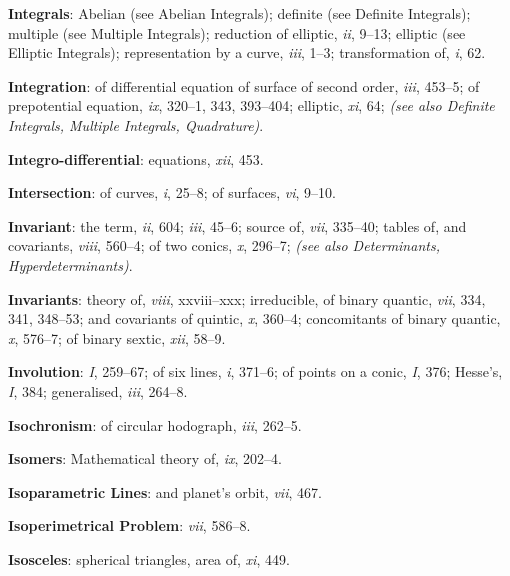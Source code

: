 \documentclass[11pt,a4paper]{article}
\newcommand{\IndexEntry}[1]{\textbf{#1}}
\newcommand{\SeeAlso}[1]{\textit{(see also #1)}}
\newcommand{\V}[1]{\textit{#1}} %
\begin{document}
\newpage

\setcounter{page}{105}

\IndexEntry{Integrals}: Abelian (see Abelian Integrals); definite (see Definite Integrals); multiple (see Multiple Integrals); reduction of elliptic, \V{ii}, 9--13; elliptic (see Elliptic Integrals); representation by a curve, \V{iii}, 1--3; transformation of, \V{i}, 62.

\IndexEntry{Integration}: of differential equation of surface of second order, \V{iii}, 453--5; of prepotential equation, \V{ix}, 320--1, 343, 393--404; elliptic, \V{xi}, 64; \SeeAlso{Definite Integrals, Multiple Integrals, Quadrature}.

\IndexEntry{Integro-differential}: equations, \V{xii}, 453.

\IndexEntry{Intersection}: of curves, \V{i}, 25--8; of surfaces, \V{vi}, 9--10.

\IndexEntry{Invariant}: the term, \V{ii}, 604; \V{iii}, 45--6; source of, \V{vii}, 335--40; tables of, and covariants, \V{viii}, 560--4; of two conics, \V{x}, 296--7; \SeeAlso{Determinants, Hyperdeterminants}.

\IndexEntry{Invariants}: theory of, \V{viii}, xxviii--xxx; irreducible, of binary quantic, \V{vii}, 334, 341, 348--53; and covariants of quintic, \V{x}, 360--4; concomitants of binary quantic, \V{x}, 576--7; of binary sextic, \V{xii}, 58--9.

\IndexEntry{Involution}: \V{I}, 259--67; of six lines, \V{i}, 371--6; of points on a conic, \V{I}, 376; Hesse's, \V{I}, 384; generalised, \V{iii}, 264--8.

\IndexEntry{Isochronism}: of circular hodograph, \V{iii}, 262--5.

\IndexEntry{Isomers}: Mathematical theory of, \V{ix}, 202--4.

\IndexEntry{Isoparametric Lines}: and planet's orbit, \V{vii}, 467.

\IndexEntry{Isoperimetrical Problem}: \V{vii}, 586--8.

\newpage

\setcounter{page}{106}

\IndexEntry{Isosceles}: spherical triangles, area of, \V{xi}, 449.
\end{document}
